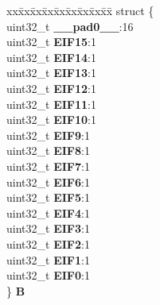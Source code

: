 \begin{DoxyCompactItemize}
\begin{tabbing}
\end{tabbing}\item 
\mbox{\label{unionSIU__tag_1_1SIU__EISR__tag_a1eadbc6bac3e3c2312a730af3291f8de}} 
\begin{tabbing}
xx\=xx\=xx\=xx\=xx\=xx\=xx\=xx\=xx\=\kill
struct \{\\
\>uint32\_t {\bfseries \_\_pad0\_\_}:16\\
\>uint32\_t {\bfseries EIF15}:1\\
\>uint32\_t {\bfseries EIF14}:1\\
\>uint32\_t {\bfseries EIF13}:1\\
\>uint32\_t {\bfseries EIF12}:1\\
\>uint32\_t {\bfseries EIF11}:1\\
\>uint32\_t {\bfseries EIF10}:1\\
\>uint32\_t {\bfseries EIF9}:1\\
\>uint32\_t {\bfseries EIF8}:1\\
\>uint32\_t {\bfseries EIF7}:1\\
\>uint32\_t {\bfseries EIF6}:1\\
\>uint32\_t {\bfseries EIF5}:1\\
\>uint32\_t {\bfseries EIF4}:1\\
\>uint32\_t {\bfseries EIF3}:1\\
\>uint32\_t {\bfseries EIF2}:1\\
\>uint32\_t {\bfseries EIF1}:1\\
\>uint32\_t {\bfseries EIF0}:1\\
\} {\bfseries B}\\


\end{tabbing}
\end{DoxyCompactItemize}
